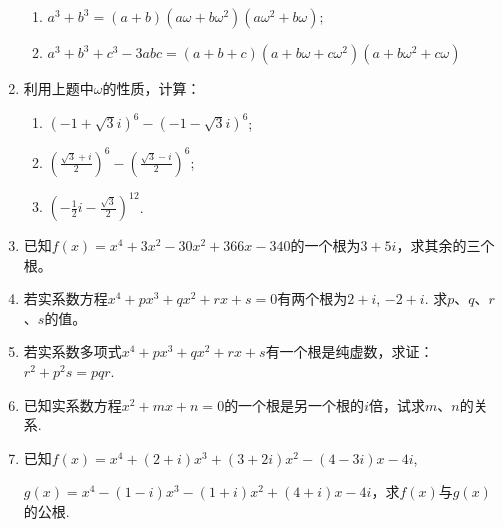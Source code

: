 \begin{enumerate}
\begin{enumerate}[(1)]
    \item $a^3+b^3=(a+b)(a\omega+b\omega^2)(a\omega^2+b\omega);$
    \item $a^{3}+b^{3}+c^{3}-3abc =(a+b+c)(a+b\omega+c\omega^{2})(a+b\omega^{2}+c\omega)$
\end{enumerate}

\item 利用上题中$\omega$的性质，计算：
\begin{multicols}{2}
\begin{enumerate}[(1)]
    \item $(-1+\sqrt{3}i)^{6}-(-1-\sqrt{3}i)^{6}$;
    \item $\left(\frac{\sqrt{3}+i}{2}\right)^{6}-\left(\frac{\sqrt{3}-i}{2}\right)^{6}$;
    \item $\left(-\frac{1}{2}i-\frac{\sqrt{3}}{2}\right)^{12}$.
\end{enumerate}    
\end{multicols}

\item 已知$f(x)=x^4+3x^2-30x^2+366x-340$的一个根为$3+5i$，求其余的三个根。
\item 若实系数方程$x^4+px^3+qx^2+rx+s=0$有两个根为$2+i$, $-2+i$. 求$p$、$q$、$r$、$s$的值。
\item 若实系数多项式$x^4+px^3+qx^2+rx+s$有一个根是纯虚数，求证：$r^2+p^2s=pqr$.

\item 已知实系数方程$x^2+mx+n=0$的一个根是另一个根的$i$倍，试求$m$、$n$的关系.
\item 已知$f(x)=x^4+(2+i)x^3+(3+2i)x^2-(4-3i)x-4i$, 

$g(x)=x^4-(1-i)x^3-(1+i)x^2+(4+i)x-4i$，求$f(x)$与$g(x)$的公根.
\end{enumerate}
